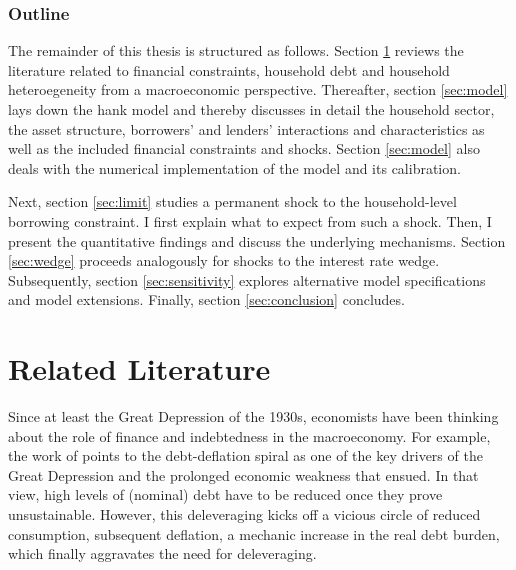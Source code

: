 \documentclass[12pt]{article} %
\numberwithin{equation}{section} %
\begin{document}
\subsubsection*{Outline}
\label{sec:outline}
The remainder of this thesis is structured as follows. Section \ref{sec:literature} reviews the literature related to financial constraints, household debt and household heteroegeneity from a macroeconomic perspective. Thereafter, section \ref{sec:model} lays down the \Gls{hank} model and thereby discusses in detail the household sector, the asset structure, borrowers' and lenders' interactions and characteristics as well as the included financial constraints and shocks. Section \ref{sec:model} also deals with the numerical implementation of the model and its calibration. 

Next, section \ref{sec:limit} studies a permanent shock to the household-level borrowing constraint. I first explain what to expect from such a shock. Then, I present the quantitative findings and discuss the underlying mechanisms. Section \ref{sec:wedge} proceeds analogously for shocks to the interest rate wedge. Subsequently, section \ref{sec:sensitivity} explores alternative model specifications and model extensions. Finally, section \ref{sec:conclusion} concludes.

\section{Related Literature}
\label{sec:literature}

Since at least the Great Depression of the 1930s, economists have been thinking about the role of finance and indebtedness in the macroeconomy. For example, the work of \textcite{fisher1933} points to the debt-deflation spiral as one of the key drivers of the Great Depression and the prolonged economic weakness that ensued. In that view, high levels of (nominal) debt have to be reduced once they prove unsustainable. However, this deleveraging kicks off a vicious circle of reduced consumption, subsequent deflation, a mechanic increase in the real debt burden, which finally aggravates the need for deleveraging.
\end{document}
